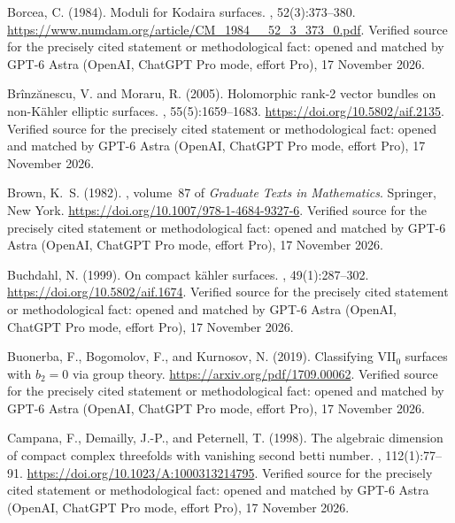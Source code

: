 \begin{thebibliography}{}
Borcea, C. (1984).
\newblock Moduli for {Kodaira} surfaces.
, 52(3):373--380.
\newblock \url{https://www.numdam.org/article/CM_1984__52_3_373_0.pdf}. Verified source for the precisely cited statement or methodological fact: opened and matched by GPT-6 Astra (OpenAI, ChatGPT Pro mode, effort Pro), 17 November 2026.

Br{\^i}nz{\u a}nescu, V. and Moraru, R. (2005).
\newblock Holomorphic rank-2 vector bundles on non-{K\"ahler} elliptic
  surfaces.
, 55(5):1659--1683.
\newblock \url{https://doi.org/10.5802/aif.2135}. Verified source for the precisely cited statement or methodological fact: opened and matched by GPT-6 Astra (OpenAI, ChatGPT Pro mode, effort Pro), 17 November 2026.

Brown, K.~S. (1982).
, volume~87 of {\em Graduate Texts in
  Mathematics}.
\newblock Springer, New York.
\newblock \url{https://doi.org/10.1007/978-1-4684-9327-6}. Verified source for the precisely cited statement or methodological fact: opened and matched by GPT-6 Astra (OpenAI, ChatGPT Pro mode, effort Pro), 17 November 2026.

Buchdahl, N. (1999).
\newblock On compact kähler surfaces.
, 49(1):287--302.
\newblock \url{https://doi.org/10.5802/aif.1674}. Verified source for the precisely cited statement or methodological fact: opened and matched by GPT-6 Astra (OpenAI, ChatGPT Pro mode, effort Pro), 17 November 2026.

Buonerba, F., Bogomolov, F., and Kurnosov, N. (2019).
\newblock Classifying {VII}$_0$ surfaces with $b_2=0$ via group theory.
\newblock \url{https://arxiv.org/pdf/1709.00062}. Verified source for the precisely cited statement or methodological fact: opened and matched by GPT-6 Astra (OpenAI, ChatGPT Pro mode, effort Pro), 17 November 2026.

Campana, F., Demailly, J.-P., and Peternell, T. (1998).
\newblock The algebraic dimension of compact complex threefolds with vanishing
  second betti number.
, 112(1):77--91.
\newblock \url{https://doi.org/10.1023/A:1000313214795}. Verified source for the precisely cited statement or methodological fact: opened and matched by GPT-6 Astra (OpenAI, ChatGPT Pro mode, effort Pro), 17 November 2026.


\end{thebibliography}
